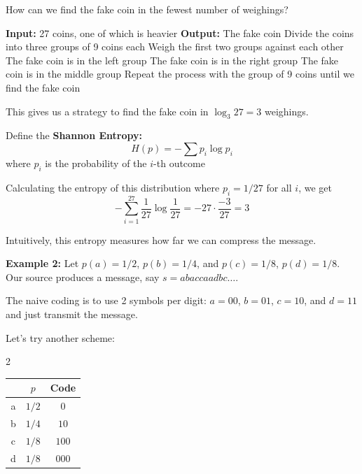 \documentclass[12pt]{report}
\newcommand*{\tbf}[1]{\ifmmode\mathbf{#1}\else\textbf{#1}\fi}
\begin{document}
How can we find the fake coin in the fewest number of weighings?

\begin{center}
    \begin{algorithmic}
        \STATE \textbf{Input:} 27 coins, one of which is heavier
        \STATE \textbf{Output:} The fake coin
        \STATE Divide the coins into three groups of 9 coins each
        \STATE Weigh the first two groups against each other
            \STATE The fake coin is in the left group
            \STATE The fake coin is in the right group
        \ELSE
            \STATE The fake coin is in the middle group
        \ENDIF
        \STATE Repeat the process with the group of 9 coins until we find the fake coin
    \end{algorithmic}
\end{center}

This gives us a strategy to find the fake coin in $\log_3 27 = 3$ weighings.

Define the \tbf{Shannon Entropy:}
\[H(p) = -\sum p_i \log p_i\]
where $p_i$ is the probability of the $i$-th outcome 

Calculating the entropy of this distribution where $p_i = 1/27$ for all $i$, we get
\[-\sum_{i=1}^{27} \frac{1}{27} \log \frac{1}{27} = -27 \cdot \frac{-3}{27} = 3\]

Intuitively, this entropy measures how far we can compress the message. 

\tbf{Example 2:} Let $p(a) = 1/2$, $p(b) = 1/4$, and $p(c) = 1/8$, $p(d) = 1/8$. Our source produces a message, say $s = abaccaadbc\dots$. 

The naive coding is to use 2 symbols per digit: $a = 00$, $b = 01$, $c = 10$, and $d = 11$ and just transmit the message. 

Let's try another scheme: 
\begin{multicols}{2}
	\begin{center}
        
            \begin{tabular}{c|cc}
                & $p$ & Code\\ \hline
                a & $1/2$ & $0$\\
                b & $1/4$ & $10$\\
                c & $1/8$ & $100$\\
                d & $1/8$ & $000$        
            \end{tabular}
    \end{center}
\end{multicols}
\end{document}
